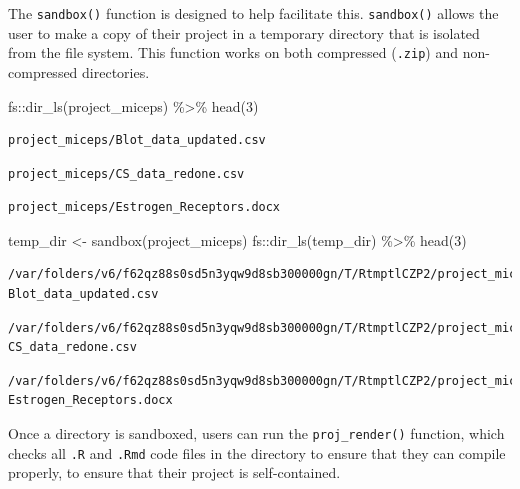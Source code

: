 \documentclass[12pt,twoside]{reedthesis}
\newenvironment{Shaded}{\begin{snugshade}}{\end{snugshade}}
\newcommand{\DecValTok}[1]{\textcolor[rgb]{0.00,0.00,0.81}{#1}}
\newcommand{\FunctionTok}[1]{\textcolor[rgb]{0.00,0.00,0.00}{#1}}
\newcommand{\NormalTok}[1]{#1}
\newcommand{\OtherTok}[1]{\textcolor[rgb]{0.56,0.35,0.01}{#1}}
\newcommand{\SpecialCharTok}[1]{\textcolor[rgb]{0.00,0.00,0.00}{#1}}
\newcommand{\StringTok}[1]{\textcolor[rgb]{0.31,0.60,0.02}{#1}}
\begin{document}
The \texttt{sandbox()} function is designed to help facilitate this. \texttt{sandbox()} allows the user to make a copy of their project in a temporary directory that is isolated from the file system. This function works on both compressed (\texttt{.zip}) and non-compressed directories.
\begin{Shaded}
\begin{Highlighting}[]
\NormalTok{fs}\SpecialCharTok{::}\FunctionTok{dir\_ls}\NormalTok{(}\StringTok{\textquotesingle{}project\_miceps\textquotesingle{}}\NormalTok{) }\SpecialCharTok{\%\textgreater{}\%} \FunctionTok{head}\NormalTok{(}\DecValTok{3}\NormalTok{)}
\end{Highlighting}
\end{Shaded}
\begin{verbatim}
project_miceps/Blot_data_updated.csv 
\end{verbatim}
\begin{verbatim}
project_miceps/CS_data_redone.csv 
\end{verbatim}
\begin{verbatim}
project_miceps/Estrogen_Receptors.docx
\end{verbatim}
\begin{Shaded}
\begin{Highlighting}[]
\NormalTok{temp\_dir }\OtherTok{\textless{}{-}} \FunctionTok{sandbox}\NormalTok{(}\StringTok{\textquotesingle{}project\_miceps\textquotesingle{}}\NormalTok{)}
\NormalTok{fs}\SpecialCharTok{::}\FunctionTok{dir\_ls}\NormalTok{(temp\_dir) }\SpecialCharTok{\%\textgreater{}\%} \FunctionTok{head}\NormalTok{(}\DecValTok{3}\NormalTok{)}
\end{Highlighting}
\end{Shaded}
\begin{verbatim}
/var/folders/v6/f62qz88s0sd5n3yqw9d8sb300000gn/T/RtmptlCZP2/project_miceps/
Blot_data_updated.csv 
\end{verbatim}
\begin{verbatim}
/var/folders/v6/f62qz88s0sd5n3yqw9d8sb300000gn/T/RtmptlCZP2/project_miceps/
CS_data_redone.csv 
\end{verbatim}
\begin{verbatim}
/var/folders/v6/f62qz88s0sd5n3yqw9d8sb300000gn/T/RtmptlCZP2/project_miceps/
Estrogen_Receptors.docx
\end{verbatim}
Once a directory is sandboxed, users can run the \texttt{proj\_render()} function, which checks all \texttt{.R} and \texttt{.Rmd} code files in the directory to ensure that they can compile properly, to ensure that their project is self-contained.
\end{document}
